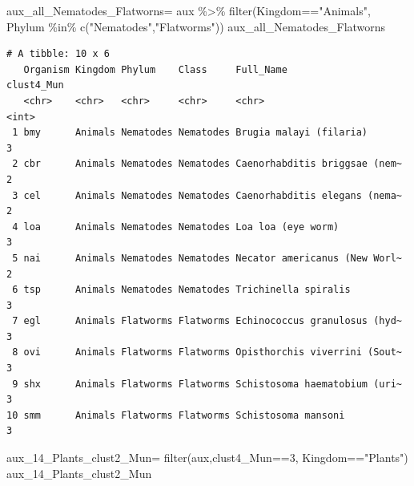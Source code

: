 \documentclass[
  letterpaper,
  DIV=11,
  numbers=noendperiod]{scrreprt}
\newenvironment{Shaded}{}{}
\newcommand{\DecValTok}[1]{\textcolor[rgb]{0.82,0.60,0.40}{#1}}
\newcommand{\FunctionTok}[1]{\textcolor[rgb]{0.38,0.69,0.94}{#1}}
\newcommand{\NormalTok}[1]{\textcolor[rgb]{0.67,0.70,0.75}{#1}}
\newcommand{\OtherTok}[1]{\textcolor[rgb]{0.15,0.68,0.38}{#1}}
\newcommand{\SpecialCharTok}[1]{\textcolor[rgb]{0.34,0.71,0.76}{#1}}
\newcommand{\StringTok}[1]{\textcolor[rgb]{0.60,0.76,0.47}{#1}}
\begin{document}
\begin{Shaded}
\begin{Highlighting}[]
\NormalTok{aux\_all\_Nematodes\_Flatworns}\OtherTok{=}\NormalTok{ aux }\SpecialCharTok{\%\textgreater{}\%} 
  \FunctionTok{filter}\NormalTok{(Kingdom}\SpecialCharTok{==}\StringTok{"Animals"}\NormalTok{,}
\NormalTok{         Phylum }\SpecialCharTok{\%in\%} \FunctionTok{c}\NormalTok{(}\StringTok{"Nematodes"}\NormalTok{,}\StringTok{"Flatworms"}\NormalTok{))}
\NormalTok{aux\_all\_Nematodes\_Flatworns}
\end{Highlighting}
\end{Shaded}

\begin{verbatim}
# A tibble: 10 x 6
   Organism Kingdom Phylum    Class     Full_Name                     clust4_Mun
   <chr>    <chr>   <chr>     <chr>     <chr>                              <int>
 1 bmy      Animals Nematodes Nematodes Brugia malayi (filaria)                3
 2 cbr      Animals Nematodes Nematodes Caenorhabditis briggsae (nem~          2
 3 cel      Animals Nematodes Nematodes Caenorhabditis elegans (nema~          2
 4 loa      Animals Nematodes Nematodes Loa loa (eye worm)                     3
 5 nai      Animals Nematodes Nematodes Necator americanus (New Worl~          2
 6 tsp      Animals Nematodes Nematodes Trichinella spiralis                   3
 7 egl      Animals Flatworms Flatworms Echinococcus granulosus (hyd~          3
 8 ovi      Animals Flatworms Flatworms Opisthorchis viverrini (Sout~          3
 9 shx      Animals Flatworms Flatworms Schistosoma haematobium (uri~          3
10 smm      Animals Flatworms Flatworms Schistosoma mansoni                    3
\end{verbatim}

\begin{Shaded}
\begin{Highlighting}[]
\NormalTok{aux\_14\_Plants\_clust2\_Mun}\OtherTok{=} \FunctionTok{filter}\NormalTok{(aux,clust4\_Mun}\SpecialCharTok{==}\DecValTok{3}\NormalTok{,}
\NormalTok{                             Kingdom}\SpecialCharTok{==}\StringTok{"Plants"}\NormalTok{)}
\NormalTok{aux\_14\_Plants\_clust2\_Mun}
\end{Highlighting}
\end{Shaded}
\end{document}
